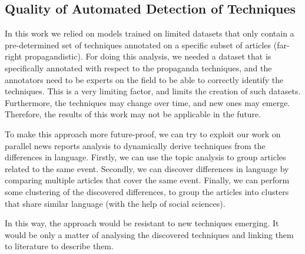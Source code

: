 \subsection{Quality of Automated Detection of Techniques}

In this work we relied on models trained on limited datasets that only contain a pre-determined set of techniques annotated on a specific subset of articles (far-right propagandistic). For doing this analysis, we needed a dataset that is specifically annotated with respect to the propaganda techniques, and the annotators need to be experts on the field to be able to correctly identify the techniques. This is a very limiting factor, and limits the creation of such datasets. Furthermore, the techniques may change over time, and new ones may emerge. Therefore, the results of this work may not be applicable in the future.

To make this approach more future-proof,
we can try to exploit our work on parallel news reports analysis to dynamically derive techniques from the differences in language.
Firstly, we can use the topic analysis to group articles related to the same event.
Secondly, we can discover differences in language by comparing multiple articles that cover the same event.
Finally, we can perform some clustering of the discovered differences, to group the articles into clusters that share similar language (with the help of social sciences).


In this way, the approach would be resistant to new techniques emerging. It would be only a matter of analysing the discovered techniques and linking them to literature to describe them.



